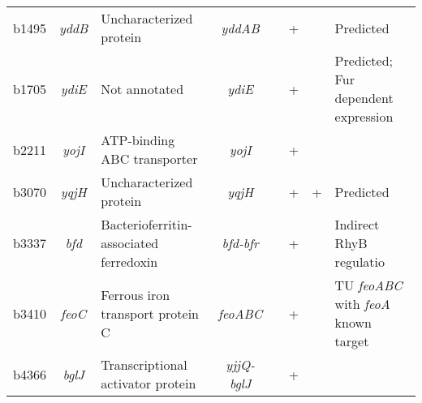 \begin{sidewaystable}
\begin{scriptsize}
\begin{tabular}{ l c >{\raggedright}p{4cm} c c c c 
>{\raggedright\arraybackslash}p{4cm} }
	b1495 & \textit{yddB} & Uncharacterized protein & \textit{yddAB} & & + & & Predicted \\[1ex]
	b1705 & \textit{ydiE} & Not annotated & \textit{ydiE} & & + & & Predicted; Fur dependent expression \\[1ex]
	b2211 & \textit{yojI} & ATP-binding ABC transporter & \textit{yojI} & & + & & \\[1ex]
	b3070 & \textit{yqjH} & Uncharacterized protein & \textit{yqjH} & & + & + & Predicted \\[1ex]
	b3337 & \textit{bfd} & Bacterioferritin-associated ferredoxin & \textit{bfd-bfr} & & + & & Indirect RhyB regulatio \\[1ex]
	b3410 & \textit{feoC} & Ferrous iron transport protein C & \textit{feoABC} & & + & & TU \textit{feoABC} with \textit{feoA} known target \\[1ex]
	b4366 & \textit{bglJ} & Transcriptional activator protein & \textit{yjjQ-bglJ} & & + & & \\[1ex]
	\bottomrule
\end{tabular}
\end{scriptsize}
\end{sidewaystable}





